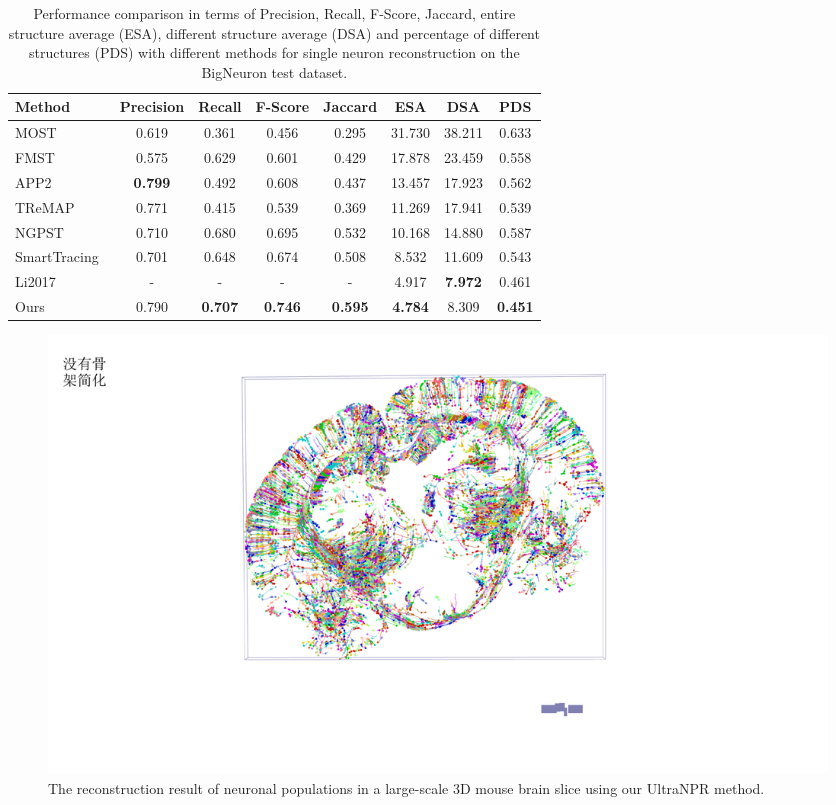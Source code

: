 \begin{table}[th]
	\centering
	\makeatletter{}\makeatother
	\caption{Performance comparison in terms of Precision, Recall, F-Score, Jaccard, entire structure average (ESA), different structure average (DSA) and percentage of different structures (PDS) with different methods for single neuron reconstruction on the BigNeuron test dataset.}
	\label{table:compare_BigNeuron}
	\begin{tabular}{lccccccc}
		\toprule
		Method & Precision & Recall & F-Score & Jaccard & ESA & DSA & PDS\\
		\midrule
		MOST~\cite{Wu2014} & 0.619 & 0.361 & 0.456 & 0.295 & 31.730 & 38.211 & 0.633\\
		FMST~\cite{Yang2018} & 0.575 & 0.629 & 0.601 & 0.429 & 17.878 & 23.459 & 0.558\\
		APP2~\cite{Xiao2013} & \textbf{0.799} & 0.492 & 0.608 & 0.437 & 13.457 & 17.923 & 0.562\\
		TReMAP~\cite{Zhou2016} & 0.771 & 0.415 & 0.539 & 0.369 & 11.269 & 17.941 & 0.539\\
		NGPST~\cite{Quan2015} & 0.710 & 0.680 & 0.695 & 0.532 & 10.168 & 14.880 & 0.587\\
		SmartTracing~\cite{Chen2015} & 0.701 & 0.648 & 0.674 & 0.508 & 8.532 & 11.609 & 0.543\\
		Li2017~\cite{Li2017} & - & - & - & - & 4.917 & \textbf{7.972} &0.461 \\
		\midrule
		Ours & 0.790 & \textbf{0.707} & \textbf{0.746}  & \textbf{0.595} & \textbf{4.784} & 8.309 & \textbf{0.451}\\
		\bottomrule
	\end{tabular}
\end{table}

\begin{figure}[t]
	\centering
	\includegraphics[width=1\columnwidth]{./Illustrations/brain_slice.pdf}
	\caption{The reconstruction result of neuronal populations in a large-scale 3D mouse brain slice using our UltraNPR method.}
	\label{fig:reconstruct_brain}
\end{figure}


